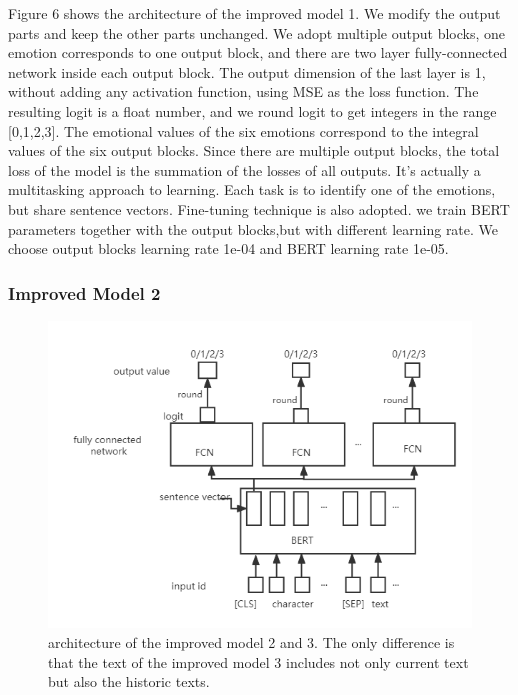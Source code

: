 \documentclass[12pt,twocolumn,letterpaper]{article}
\begin{document}
Figure 6 shows the architecture of the improved model 1. We modify the output parts and keep the other parts unchanged. We adopt multiple output blocks, one emotion corresponds to one output block, and there are two layer fully-connected network inside each output block. The output dimension of the last layer is 1, without adding any activation function, using MSE as the loss function.  The resulting logit is a float number, and we round logit to get integers in the range [0,1,2,3]. The emotional values of the six emotions correspond to the integral values of the six output blocks. Since there are multiple output blocks, the total loss of the model is the summation of the losses of all outputs.  It's actually a multitasking approach to learning. Each task is to identify one of the emotions, but share sentence vectors.
Fine-tuning technique is also adopted. we train BERT parameters together with the output blocks,but with different learning rate. We choose output blocks learning rate 1e-04 and BERT learning rate 1e-05.
\subsubsection{Improved Model 2}
\begin{figure}
\begin{center}
\includegraphics[scale=0.5]{Method3.png}
\end{center}
   \caption{architecture of the improved model 2 and 3. The only difference is that the text of the improved model 3 includes not only current text but also the historic texts. }
\label{fig:short}
\end{figure}
\end{document}

